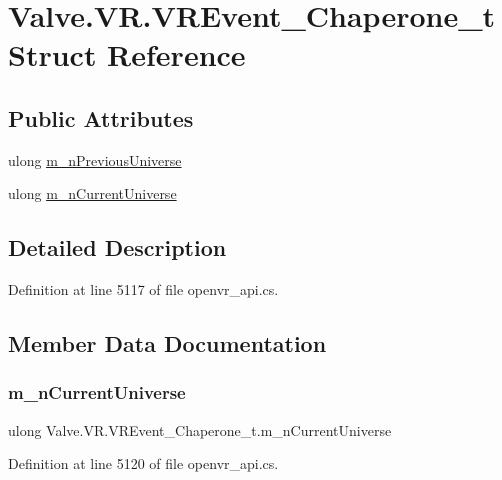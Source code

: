 \hypertarget{struct_valve_1_1_v_r_1_1_v_r_event___chaperone__t}{}\section{Valve.\+V\+R.\+V\+R\+Event\+\_\+\+Chaperone\+\_\+t Struct Reference}
\label{struct_valve_1_1_v_r_1_1_v_r_event___chaperone__t}
\subsection*{Public Attributes}
\begin{DoxyCompactItemize}
\item 
ulong \mbox{\hyperlink{struct_valve_1_1_v_r_1_1_v_r_event___chaperone__t_a4bd240b1983fade1caca0bc9757ae2db}{m\+\_\+n\+Previous\+Universe}}
\item 
ulong \mbox{\hyperlink{struct_valve_1_1_v_r_1_1_v_r_event___chaperone__t_a8a300c25cf2a4bf477d579cc3f65042c}{m\+\_\+n\+Current\+Universe}}
\end{DoxyCompactItemize}


\subsection{Detailed Description}


Definition at line 5117 of file openvr\+\_\+api.\+cs.



\subsection{Member Data Documentation}
\mbox{\label{struct_valve_1_1_v_r_1_1_v_r_event___chaperone__t_a8a300c25cf2a4bf477d579cc3f65042c}} 
\subsubsection{\texorpdfstring{m\_nCurrentUniverse}{m\_nCurrentUniverse}}
{\footnotesize\ttfamily ulong Valve.\+V\+R.\+V\+R\+Event\+\_\+\+Chaperone\+\_\+t.\+m\+\_\+n\+Current\+Universe}



Definition at line 5120 of file openvr\+\_\+api.\+cs.


